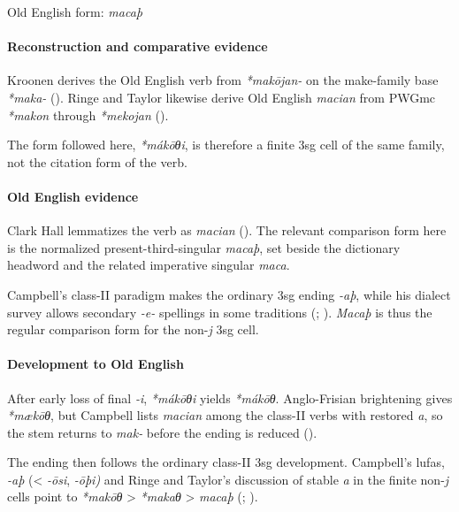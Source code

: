 \documentclass[
  british,
  a4paper,
]{article}
\begin{document}
Old English form: \emph{macaþ}

\paragraph{Reconstruction and comparative
evidence}\label{reconstruction-and-comparative-evidence-58}

Kroonen derives the Old English verb from \emph{*makōjan-} on the
make-family base \emph{*maka-} (). Ringe and Taylor likewise derive Old English \emph{macian} from
PWGmc \emph{*makon} through \emph{*mekojan}
().

The form followed here, \emph{*mákōθi}, is therefore a finite 3sg cell
of the same family, not the citation form of the verb.

\paragraph{Old English evidence}\label{old-english-evidence-58}

Clark Hall lemmatizes the verb as \emph{macian}
(). The relevant
comparison form here is the normalized present-third-singular
\emph{macaþ}, set beside the dictionary headword and the related
imperative singular \emph{maca}.

Campbell's class-II paradigm makes the ordinary 3sg ending \emph{-aþ},
while his dialect survey allows secondary \emph{-e-} spellings in some
traditions (;
). \emph{Macaþ} is thus the
regular comparison form for the non-\emph{j} 3sg cell.

\paragraph{Development to Old
English}\label{development-to-old-english-58}

After early loss of final \emph{-i}, \emph{*mákōθi} yields
\emph{*mákōθ}. Anglo-Frisian brightening gives \emph{*mækōθ}, but
Campbell lists \emph{macian} among the class-II verbs with restored
\emph{a}, so the stem returns to \emph{mak-} before the ending is
reduced ().

The ending then follows the ordinary class-II 3sg development.
Campbell's lufas, \emph{-aþ} (\textless{} \emph{-ōsi}, \emph{-ōþi)} and
Ringe and Taylor's discussion of stable \emph{a} in the finite
non-\emph{j} cells point to \emph{*makōθ} \textgreater{} \emph{*makaθ}
\textgreater{} \emph{macaþ} (; ).
\end{document}
